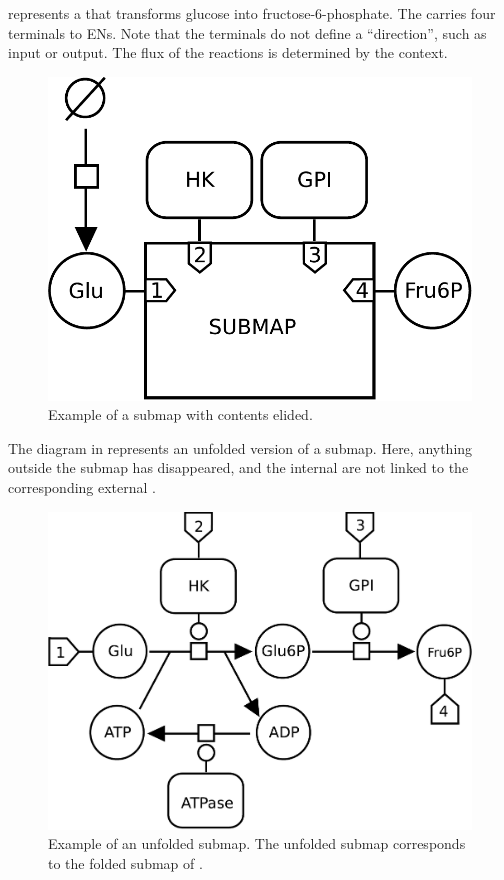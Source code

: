  represents a  that transforms glucose into fructose-6-phosphate. The  carries four terminals to ENs.  Note that the terminals do not define a ``direction'', such as input or output.  The flux of the reactions is determined by the context.

\begin{figure}[H]
  \centering
  \includegraphics[scale = 0.4]{examples/submap-folded}
  \caption{Example of a submap with contents elided.}
  \label{fig:submap-folded}
\end{figure}

The diagram in  represents an unfolded version of a submap.  Here, anything outside the submap has disappeared, and the internal  are not linked to the corresponding external .

\begin{figure}[H]
  \centering
  \includegraphics[scale = 0.35]{examples/submap-dissociated}
  \caption{Example of an unfolded submap. The unfolded submap corresponds to the folded submap of .}
  \label{fig:submap-unfolded}
\end{figure}


\normalcolor


